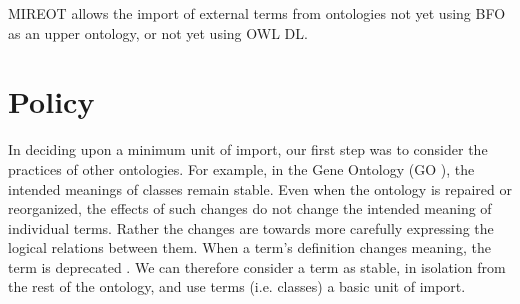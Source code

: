 \documentclass[a4paper,10pt,twocolumn]{article}
\begin{document}
\ac{MIREOT} allows the import of external terms from ontologies not yet using BFO as an upper ontology, or not yet using OWL DL.


\section*{Policy}



In deciding upon a minimum unit of import, our first step was to consider the practices of other ontologies.
For example, in the Gene Ontology (GO \cite{RefWorks:79}), the intended meanings of classes remain stable.
Even when the ontology is repaired or reorganized, the effects of such changes do not change the intended meaning of individual terms.
Rather the changes are towards more carefully expressing the logical relations between them.
When a term's definition changes meaning, the term is deprecated \cite{RefWorks:1560}.
We can therefore consider a term as stable, in isolation from the rest of the ontology, and use terms (i.e. classes) a basic unit of import.



\end{document}
